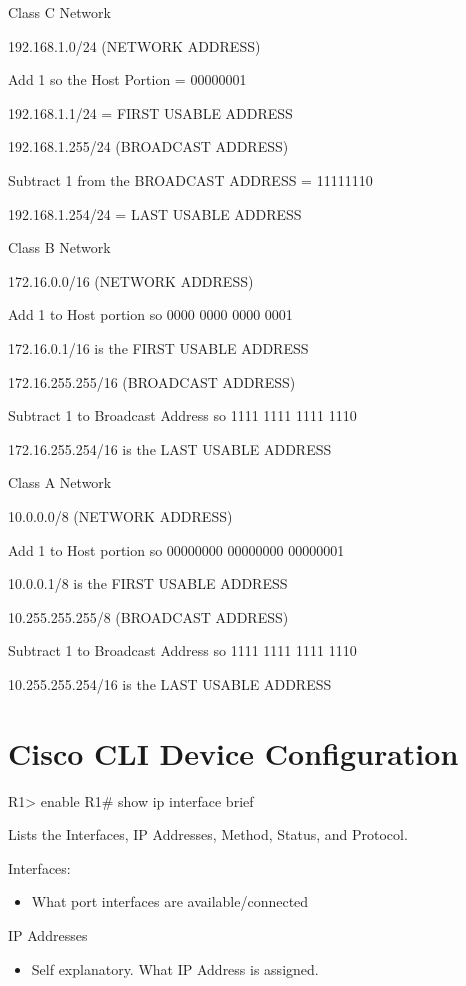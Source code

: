 Class C Network

192.168.1.0/24 (NETWORK ADDRESS)

Add 1 so the Host Portion = 00000001

192.168.1.1/24 = FIRST USABLE ADDRESS

192.168.1.255/24 (BROADCAST ADDRESS)

Subtract 1 from the BROADCAST ADDRESS = 11111110

192.168.1.254/24 = LAST USABLE ADDRESS

Class B Network

172.16.0.0/16 (NETWORK ADDRESS)

Add 1 to Host portion so 0000 0000 0000 0001

172.16.0.1/16 is the FIRST USABLE ADDRESS

172.16.255.255/16 (BROADCAST ADDRESS)

Subtract 1 to Broadcast Address so 1111 1111 1111 1110

172.16.255.254/16 is the LAST USABLE ADDRESS

Class A Network

10.0.0.0/8 (NETWORK ADDRESS)

Add 1 to Host portion so 00000000 00000000 00000001

10.0.0.1/8 is the FIRST USABLE ADDRESS

10.255.255.255/8 (BROADCAST ADDRESS)

Subtract 1 to Broadcast Address so 1111 1111 1111 1110

10.255.255.254/16 is the LAST USABLE ADDRESS

\section{Cisco CLI Device
Configuration}\label{cisco-cli-device-configuration}

R1\textgreater{} enable R1\# show ip interface brief

Lists the Interfaces, IP Addresses, Method, Status, and Protocol.

Interfaces:

\begin{itemize}
\tightlist
\item
  What port interfaces are available/connected
\end{itemize}

IP Addresses

\begin{itemize}
\tightlist
\item
  Self explanatory. What IP Address is assigned.
\end{itemize}

